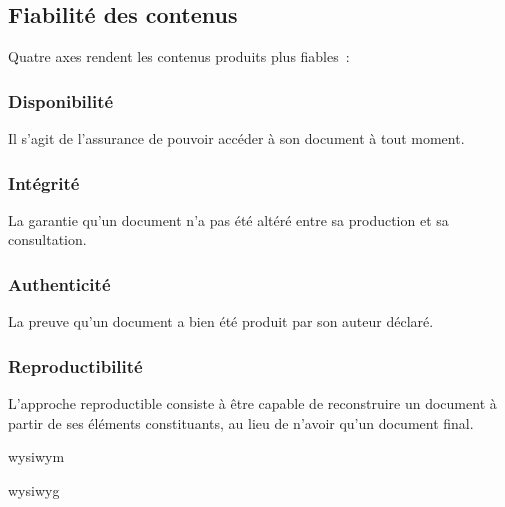 \hr

\subsection{Fiabilité des contenus}

Quatre axes rendent les contenus produits plus fiables :

\subsubsection{Disponibilité}

Il s’agit de l’assurance de pouvoir accéder à son document à tout moment.

\subsubsection{Intégrité}

La garantie qu’un document n’a pas été altéré
entre sa production et sa consultation.

\subsubsection{Authenticité}

La preuve qu’un document a bien été produit par son auteur déclaré.

\subsubsection{Reproductibilité}

L’approche reproductible consiste à être capable de reconstruire un document
à partir de ses éléments constituants, au lieu de n’avoir qu’un document final.

\begin{itmz}
\item{\gls{wysiwym} \cite{wysiwym}}
\item{\gls{wysiwyg} \cite{wysiwyg}}
\end{itmz}

\pagebreak
